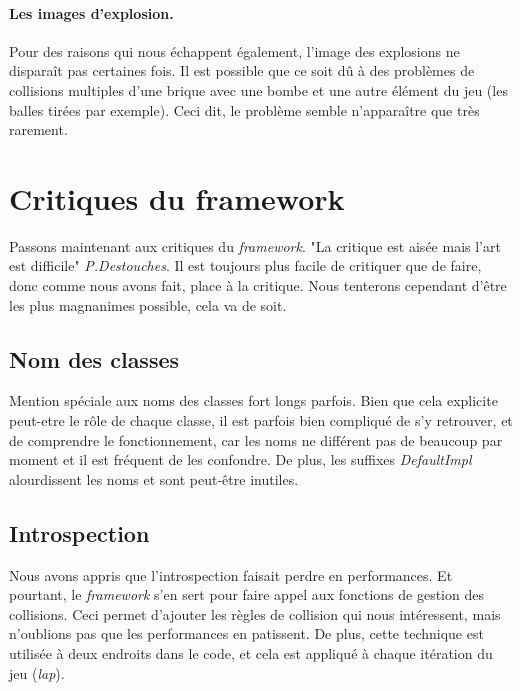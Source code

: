 \documentclass[a4paper,10pt]{article}
\begin{document}
\paragraph{Les images d'explosion.}
Pour des raisons qui nous échappent également, l'image des explosions ne disparaît pas certaines fois. Il est possible
que ce soit dû à des problèmes de collisions multiples d'une brique avec une bombe et une autre élément du jeu (les
balles tirées par exemple). Ceci dit, le problème semble n'apparaître que très rarement.


\section{Critiques du framework }
    Passons maintenant aux critiques du \textit{framework}. "La critique est aisée mais l'art est difficile" \textit{P.Destouches}.
    Il est toujours plus facile de critiquer que de faire, donc comme nous avons fait, place à la critique. Nous tenterons
    cependant d'être les plus magnanimes possible, cela va de soit.

    \subsection{Nom des classes}
        Mention spéciale aux noms des classes fort longs parfois. Bien que cela explicite peut-etre le rôle
        de chaque classe, il est parfois bien compliqué de s'y retrouver, et de comprendre le fonctionnement,
        car les noms ne différent pas de beaucoup par moment et il est fréquent de les confondre.
        De plus, les suffixes \textit{DefaultImpl} alourdissent les noms et sont peut-être inutiles.

    \subsection{Introspection}
       	 Nous avons appris que l'introspection faisait perdre en performances. Et pourtant, le \textit{framework} s'en sert
        pour faire appel aux fonctions de gestion des collisions. Ceci permet d'ajouter les règles de collision
        qui nous intéressent, mais n'oublions pas que les performances en patissent. De plus, cette technique est
        utilisée à deux endroits dans le code, et cela est appliqué à chaque itération du jeu (\textit{lap}).

\end{document}
